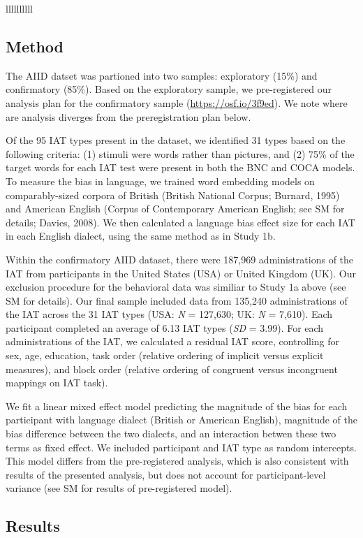 \documentclass[9pt,twocolumn,twoside,lineno]{pnas-new}
\begin{document}
\begin{table}{llllllllll}
\subsection*{Method}\label{method}

The AIID datset was partioned into two samples: exploratory (15\%) and
confirmatory (85\%). Based on the exploratory sample, we pre-registered
our analysis plan for the confirmatory sample
(\url{https://osf.io/3f9ed}). We note where are analysis diverges from
the preregistration plan below.

Of the 95 IAT types present in the dataset, we identified 31 types based
on the following criteria: (1) stimuli were words rather than pictures,
and (2) 75\% of the target words for each IAT test were present in both
the BNC and COCA models. To measure the bias in language, we trained
word embedding models on comparably-sized corpora of British (British
National Corpus; Burnard, 1995) and American English (Corpus of
Contemporary American English; see SM for details; Davies, 2008). We
then calculated a language bias effect size for each IAT in each English
dialect, using the same method as in Study 1b.

Within the confirmatory AIID dataset, there were 187,969 administrations
of the IAT from participants in the United States (USA) or United
Kingdom (UK). Our exclusion procedure for the behavioral data was
similiar to Study 1a above (see SM for details). Our final sample
included data from 135,240 administrations of the IAT across the 31 IAT
types (USA: \emph{N} = 127,630; UK: \emph{N} = 7,610). Each participant
completed an average of 6.13 IAT types (\emph{SD} = 3.99). For each
administrations of the IAT, we calculated a residual IAT score,
controlling for sex, age, education, task order (relative ordering of
implicit versus explicit measures), and block order (relative ordering
of congruent versus incongruent mappings on IAT task).

We fit a linear mixed effect model predicting the magnitude of the bias
for each participant with language dialect (British or American
English), magnitude of the bias difference between the two dialects, and
an interaction betwen these two terms as fixed effect. We included
participant and IAT type as random intercepts. This model differs from
the pre-registered analysis, which is also consistent with results of
the presented analysis, but does not account for participant-level
variance (see SM for results of pre-registered model).

\subsection*{Results}\label{results-3}


\end{table}
\end{document}
